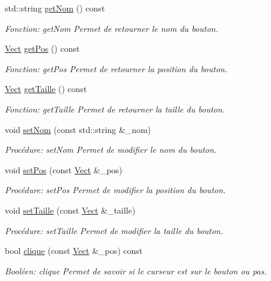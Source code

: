 \begin{DoxyCompactItemize}
std\+::string \hyperlink{classBouton_ac7c8e0b20bd304bd82b5dbd5e9931378}{get\+Nom} () const
\begin{DoxyCompactList}\small\item\em Fonction\+: get\+Nom Permet de retourner le nom du bouton. \end{DoxyCompactList}\item 
\hyperlink{classVect}{Vect} \hyperlink{classBouton_aed3d0897774100bd880276bd2e73db27}{get\+Pos} () const
\begin{DoxyCompactList}\small\item\em Fonction\+: get\+Pos Permet de retourner la position du bouton. \end{DoxyCompactList}\item 
\hyperlink{classVect}{Vect} \hyperlink{classBouton_ab29ffdc7229d4d702f8dc6498ae08f20}{get\+Taille} () const
\begin{DoxyCompactList}\small\item\em Fonction\+: get\+Taille Permet de retourner la taille du bouton. \end{DoxyCompactList}\item 
void \hyperlink{classBouton_a4bdd74233fa0a3f6fe67d463b75d3f4a}{set\+Nom} (const std\+::string \&\+\_\+nom)
\begin{DoxyCompactList}\small\item\em Procédure\+: set\+Nom Permet de modifier le nom du bouton. \end{DoxyCompactList}\item 
void \hyperlink{classBouton_a393e195ff7d1ff7a5d3c79edc922b0cd}{set\+Pos} (const \hyperlink{classVect}{Vect} \&\+\_\+pos)
\begin{DoxyCompactList}\small\item\em Procédure\+: set\+Pos Permet de modifier la position du bouton. \end{DoxyCompactList}\item 
void \hyperlink{classBouton_a972600e88d0a65431c27bec898fbba36}{set\+Taille} (const \hyperlink{classVect}{Vect} \&\+\_\+taille)
\begin{DoxyCompactList}\small\item\em Procédure\+: set\+Taille Permet de modifier la taille du bouton. \end{DoxyCompactList}\item 
bool \hyperlink{classBouton_aaeefb86ea06be1a11c7098e939374e42}{clique} (const \hyperlink{classVect}{Vect} \&\+\_\+pos) const
\begin{DoxyCompactList}\small\item\em Booléen\+: clique Permet de savoir si le curseur est sur le bouton ou pas. \end{DoxyCompactList}\end{DoxyCompactItemize}


